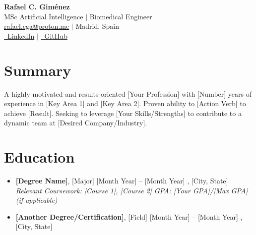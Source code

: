 \documentclass[letterpaper,10pt]{article}
\begin{document}
\begin{center}
    \vspace{-1cm} %
    \color{headerblue}
    {\Huge \bfseries Rafael C. Giménez} \\
    \vspace{3pt}
    \normalsize
    MSc Artificial Intelligence $|$ Biomedical Engineer \\
    \vspace{5pt}
    \color{textgray}
    \href{mailto:rafael.cga@proton.me}{rafael.cga@proton.me} $|$ Madrid, Spain \\
    \vspace{3pt}
    \href{https://www.linkedin.com/in/rafaelcga/}{\faLinkedin\ LinkedIn} $|$ \href{https://github.com/rafaelcga}{\faGithub\ GitHub} \\
\end{center}
\vspace{10pt} %

\section*{Summary}
\vspace{5pt}
\color{textgray}

A highly motivated and results-oriented [Your Profession] with [Number] years of experience in [Key Area 1] and [Key Area 2]. Proven ability to [Action Verb] to achieve [Result]. Seeking to leverage [Your Skills/Strengths] to contribute to a dynamic team at [Desired Company/Industry].

\section*{Education}
\vspace{5pt}
\color{textgray}
\begin{itemize}
    \item \textbf{[Degree Name]}, [Major] \hfill [Month Year] -- [Month Year]
          , [City, State]
          \newline \textit{Relevant Coursework: [Course 1], [Course 2]}
          \newline \textit{GPA: [Your GPA]/[Max GPA] (if applicable)}
    \item \textbf{[Another Degree/Certification]}, [Field] \hfill [Month Year] -- [Month Year]
          , [City, State]
\end{itemize}
\end{document}
